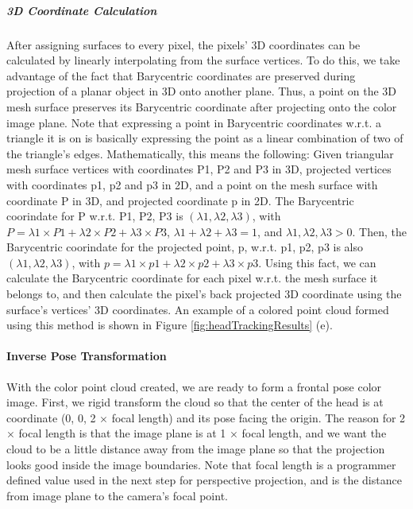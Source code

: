 \subparagraph{3D Coordinate Calculation}
After assigning surfaces to every pixel, the pixels' 3D coordinates can be calculated by linearly interpolating from the surface vertices.  To do this, we take advantage of the fact that Barycentric coordinates are preserved during projection of a planar object in 3D onto another plane.  Thus, a point on the 3D mesh surface preserves its Barycentric coordinate after projecting onto the color image plane.  Note that expressing a point in Barycentric coordinates w.r.t. a triangle it is on is basically expressing the point as a linear combination of two of the triangle's edges.  Mathematically, this means the following: Given triangular mesh surface vertices with coordinates P1, P2 and P3 in 3D, projected vertices with coordinates p1, p2 and p3 in 2D, and a point on the mesh surface with coordinate P in 3D, and projected coordinate p in 2D.  The Barycentric coorindate for P w.r.t. {P1, P2, P3} is \( (\lambda1, \lambda2, \lambda3)  \), with \( P = \lambda1 \times P1 + \lambda2 \times P2 + \lambda3 \times P3 \), \( \lambda1 + \lambda2 + \lambda3 = 1 \), and \( \lambda1, \lambda2, \lambda3 > 0 \).  Then, the Barycentric coorindate for the projected point, p, w.r.t. {p1, p2, p3} is also \( (\lambda1, \lambda2, \lambda3)  \), with \( p = \lambda1 \times p1 + \lambda2 \times p2 + \lambda3 \times p3 \).  Using this fact, we can calculate the Barycentric coordinate for each pixel w.r.t. the mesh surface it belongs to, and then calculate the pixel's back projected 3D coordinate using the surface's vertices' 3D coordinates.  An example of a colored point cloud formed using this method is shown in Figure \ref{fig:headTrackingResults} (e).

\paragraph{Inverse Pose Transformation}
With the color point cloud created, we are ready to form a frontal pose color image.  First, we rigid transform the cloud so that the center of the head is at coordinate (0, 0, 2 \( \times\) focal length) and its pose facing the origin.  The reason for 2 \( \times\) focal length is that the image plane is at 1 \( \times\) focal length, and we want the cloud to be a little distance away from the image plane so that the projection looks good inside the image boundaries.  Note that focal length is a programmer defined value used in the next step for perspective projection, and is the distance from image plane to the camera's focal point.

